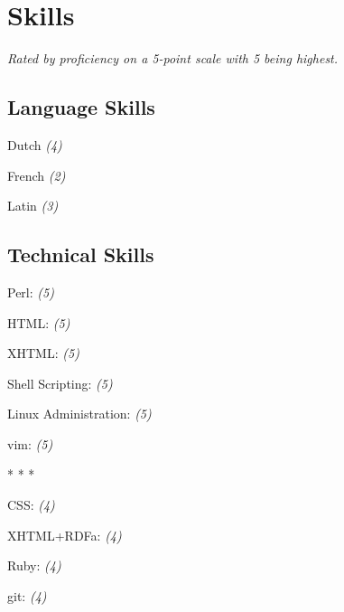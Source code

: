 \documentclass[]{article}
\begin{document}
\section*{Skills}



\emph{Rated by proficiency on a 5-point scale with 5 being highest.}
\subsection*{Language Skills}
Dutch \emph{(4)}
  \label{dutch4}

       

French \emph{(2)}
  \label{french2}

       

Latin \emph{(3)}
  \label{latin3}

       
	
\subsection*{Technical Skills}	
 Perl: \emph{(5)}
  \label{perl5}

       

 HTML: \emph{(5)}
  \label{html5}

       

 XHTML: \emph{(5)}
  \label{xhtml5}

       

 Shell Scripting: \emph{(5)}
  \label{shellscripting5}

       

 Linux Administration: \emph{(5)}
  \label{linuxadministration5}

       

 vim: \emph{(5)}
  \label{vim5}

       

 \begin{center}* * * \end{center}
 CSS: \emph{(4)}
  \label{css4}

       

 XHTML+RDFa: \emph{(4)}
  \label{xhtml+rdfa4}

       

 Ruby: \emph{(4)}
  \label{ruby4}

       

 git: \emph{(4)}
  \label{git4}
\end{document}
